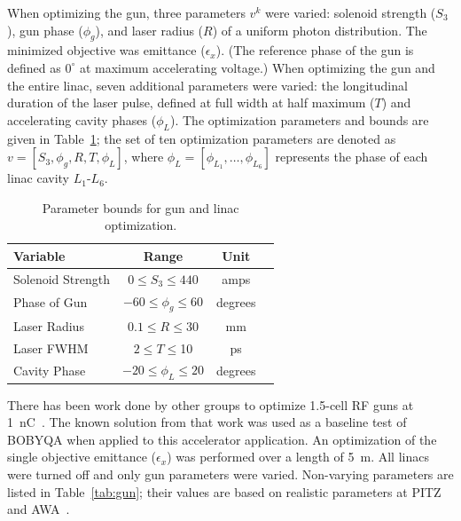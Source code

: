 When optimizing the gun, three parameters $v^k$ were varied: 
solenoid strength ($S_3$), gun phase ($\phi_g$), 
and laser radius ($R$) of a uniform photon distribution. 
The minimized objective was emittance ($\epsilon_x$).
(The reference phase of the gun is defined as $0^{\circ}$ at maximum accelerating voltage.) 
When optimizing the gun and the entire linac, seven additional parameters were 
varied: the longitudinal duration of the laser pulse, defined at full width at half maximum ($T$)
and accelerating cavity phases ($\phi_L$). The optimization parameters and
bounds are given in Table~\ref{tab:parameters}; the set of
ten optimization parameters are denoted as $v=[S_3, \phi_g, R, T, \phi_L]$, where 
$\phi_L=[\phi_{L_1},\ldots,\phi_{L_6}]$ represents the phase of each linac cavity $L_1$-$L_6$. 
\begin{table}
	\caption{\label{tab:parameters} Parameter bounds for gun and linac optimization.}
	\begin{center}
		\begin{tabular}{ l *{3}{c}} 
			\toprule
			\toprule
			\textbf{Variable} & \textbf{Range} & \textbf{Unit} \\
			\midrule
			Solenoid Strength & $ 0 \le S_3 \le 440$  & amps \\
			Phase of Gun & $-60 \le \phi_g \le 60$  & degrees \\
			Laser Radius  & $0.1 \le R \le 30$  & mm \\
			Laser FWHM & $2 \le T \le $10  & ps \\
			Cavity Phase  & $-20 \le \phi_L \le 20$  & degrees \\
			\bottomrule	
		\end{tabular}
	\end{center}
\end{table}


 \label{sec:gunbobyqa}
There has been work done by other groups to optimize 1.5-cell RF guns
at \SI{1}{nC}~\cite{pitz}. The known solution from that work was used as 
a baseline test of BOBYQA when applied to this accelerator application.
An optimization of the single objective emittance ($\epsilon_x$) was 
performed over a length of \SI{5}{m}. 
All linacs were turned off and only gun parameters were varied. 
Non-varying parameters are listed in Table~\ref{tab:gun}; 
their values are based on realistic parameters at PITZ and AWA~\cite{pitz, benchmark}.

